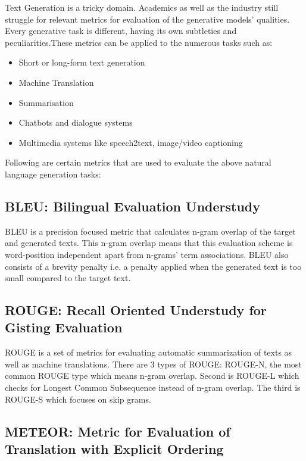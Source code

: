 
Text Generation is a tricky domain. Academics as well as the industry still struggle for relevant metrics for evaluation of the generative models' qualities. Every generative task is different, having its own subtleties and peculiarities.These metrics can be applied to the numerous tasks such as:
\begin{itemize}
	\item Short or long-form text generation
	\item Machine Translation
	\item Summarisation
	\item Chatbots and dialogue systems
	\item Multimedia systems like speech2text, image/video captioning
\end{itemize}
Following are certain metrics that are used to evaluate the above natural language generation tasks:

\subsection{BLEU: Bilingual Evaluation Understudy}

\par BLEU \cite{bleu} is a precision focused metric that calculates n-gram overlap of the target and generated texts. This n-gram overlap means that this evaluation scheme is word-position independent apart from n-grams' term associations. BLEU also consists of a brevity penalty i.e. a penalty applied when the generated text is too small compared to the target text.


\subsection{ROUGE: Recall Oriented Understudy for Gisting Evaluation}

\par ROUGE \cite{rouge} is a set of metrics for evaluating automatic summarization of texts as well as machine translations. There are 3 types of ROUGE: ROUGE-N, the most common ROUGE type which means n-gram overlap. Second is ROUGE-L which checks for Longest Common Subsequence instead of n-gram overlap. The third is ROUGE-S which focuses on skip grams.


\subsection{METEOR: Metric for Evaluation of Translation with Explicit Ordering}

